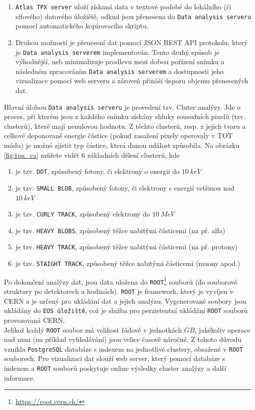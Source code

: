 \begin{description}
		\begin{enumerate}
			\item \texttt{Atlas TPX server} uloží získaná data v textové podobě do lokálního (či síťového) datového úložiště, odkud jsou přenesena do \texttt{Data analysis serveru} pomocí automatického kopírovacího skriptu.
			\item Druhou možností je přenesení dat pomocí JSON REST API protokolu, který je \texttt{Data analysis serverem} implementován. Tento druhý způsob je výhodnější, neb minimalizuje prodlevu mezi dobou pořízení snímku a následném zpracováním \texttt{Data analysis serverem} a dostupnosti jeho vizualizace pomocí web serveru a zároveň přináší úsporu objemu přenesených dat.
		\end{enumerate}
		Hlavní úlohou \texttt{Data analysis serveru} je provedení tzv. Cluter analýzy. Jde o proces, při kterém jsou z každého snímku získány shluky sousedních pixelů (tzv. clusterů), které mají nenulovou hodnotu. Z těchto clusterů, resp. z jejich tvaru a celkové deponované energie částice (pokud zasažení pixely operovaly v TOT módu) je možné zjistit typ částice, která danou událost způsobila. Na obrázku \ref{fig:tpx_ca} můžete vidět 6 základních dělení clusterů, kde
		 \begin{enumerate}[label=(\alph*)]
			\item je tzv. \texttt{DOT}, způsobený fotony, či elektrony o energii do $10~keV$
			\item je tzv. \texttt{SMALL BLOB}, způsobený fotony, či elektrony s energií vetšinou nad $10~keV$
			\item je tzv. \texttt{CURLY TRACK}, způsobený elektrony do $10~MeV$
			\item je tzv. \texttt{HEAVY BLOBS}, způsobený těžce nabitými částicemi (na př. alfa)
			\item je tzv. \texttt{HEAVY TRACK}, způsobený těžce nabitými částicemi (na př. protony)
			\item je tzv. \texttt{STAIGHT TRACK}, způsobený těžce nabitými částicemi (muony apod.)
		\end{enumerate}
		Po dokončení analýzy dat, jsou data uložena do \texttt{ROOT}\footnote{\url{https://root.cern.ch/}} souborů (do souborové struktury po detektorech a hodinách). \texttt{ROOT} je framework, který je vyvíjen v CERN a je určený pro ukládání dat a jejich analýzu. Vygenerované soubory jsou ukládány do \texttt{EOS úložiště}, což je služba pro perzistentní ukládání \texttt{ROOT} souborů provozovaná CERN.\\
		Jelikož každý \texttt{ROOT} soubor má velikost řádově v jednotkách $GB$, jakékoliv operace nad nimi (na příklad vyhledávání) jsou velice časově náročné. Z tohoto důvodu vznikla \texttt{PostgreSQL} databáze s indexem na jednotlivé clustery, obsažené v \texttt{ROOT} souborech. 
		Pro vizualizaci dat slouží web server, který pomocí databáze s indexem a \texttt{ROOT} souborů poskytuje online výsledky cluster analýzy a další informace.
\end{description}

